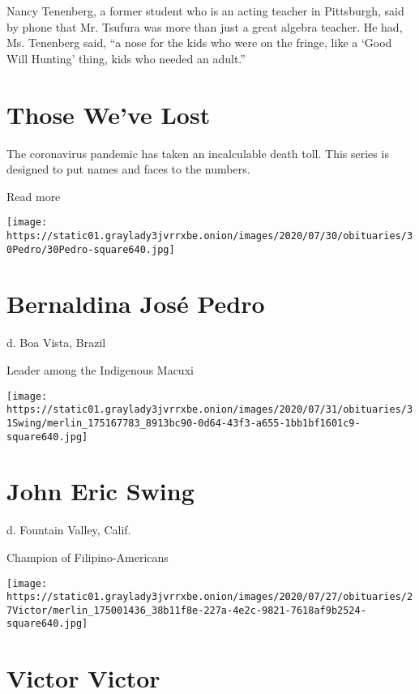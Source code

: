 Nancy Tenenberg, a former student who is an acting teacher in
Pittsburgh, said by phone that Mr. Tsufura was more than just a great
algebra teacher. He had, Ms. Tenenberg said, ``a nose for the kids who
were on the fringe, like a `Good Will Hunting' thing, kids who needed an
adult.''

\href{https://www.nytimes3xbfgragh.onion/interactive/2020/obituaries/people-died-coronavirus-obituaries.html?action=click\&pgtype=Article\&state=default\&region=BELOW_MAIN_CONTENT\&context=covid_obits_promo}{}

\hypertarget{those-weve-lost}{%
\section{Those We've Lost}\label{those-weve-lost}}

The coronavirus pandemic has taken an incalculable death toll. This
series is designed to put names and faces to the numbers.

Read more

\texttt{[image: https://static01.graylady3jvrrxbe.onion/images/2020/07/30/obituaries/30Pedro/30Pedro-square640.jpg]}

\hypertarget{bernaldina-josuxe9-pedro}{%
\section{Bernaldina José Pedro}\label{bernaldina-josuxe9-pedro}}

d. Boa Vista, Brazil

Leader among the Indigenous Macuxi

\texttt{[image: https://static01.graylady3jvrrxbe.onion/images/2020/07/31/obituaries/31Swing/merlin\_175167783\_8913bc90-0d64-43f3-a655-1bb1bf1601c9-square640.jpg]}

\hypertarget{john-eric-swing}{%
\section{John Eric Swing}\label{john-eric-swing}}

d. Fountain Valley, Calif.

Champion of Filipino-Americans

\texttt{[image: https://static01.graylady3jvrrxbe.onion/images/2020/07/27/obituaries/27Victor/merlin\_175001436\_38b11f8e-227a-4e2c-9821-7618af9b2524-square640.jpg]}

\hypertarget{victor-victor}{%
\section{Victor Victor}\label{victor-victor}}

